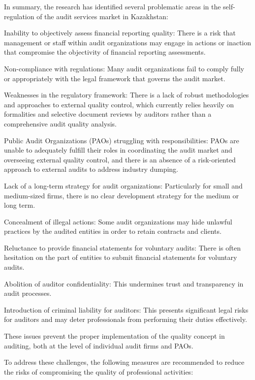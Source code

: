 \begin{multicols}{2}
In summary, the research has identified several problematic areas in the
self-regulation of the audit services market in Kazakhstan:

Inability to objectively assess financial reporting quality: There is a
risk that management or staff within audit organizations may engage in
actions or inaction that compromise the objectivity of financial
reporting assessments.

Non-compliance with regulations: Many audit organizations fail to comply
fully or appropriately with the legal framework that governs the audit
market.

Weaknesses in the regulatory framework: There is a lack of robust
methodologies and approaches to external quality control, which
currently relies heavily on formalities and selective document reviews
by auditors rather than a comprehensive audit quality analysis.

Public Audit Organizations (PAOs) struggling with responsibilities: PAOs
are unable to adequately fulfill their roles in coordinating the audit
market and overseeing external quality control, and there is an absence
of a risk-oriented approach to external audits to address industry
dumping.

Lack of a long-term strategy for audit organizations: Particularly for
small and medium-sized firms, there is no clear development strategy for
the medium or long term.

Concealment of illegal actions: Some audit organizations may hide
unlawful practices by the audited entities in order to retain contracts
and clients.

Reluctance to provide financial statements for voluntary audits: There
is often hesitation on the part of entities to submit financial
statements for voluntary audits.

Abolition of auditor confidentiality: This undermines trust and
transparency in audit processes.

Introduction of criminal liability for auditors: This presents
significant legal risks for auditors and may deter professionals from
performing their duties effectively.

These issues prevent the proper implementation of the quality concept in
auditing, both at the level of individual audit firms and PAOs.

To address these challenges, the following measures are recommended to
reduce the risks of compromising the quality of professional activities:


\end{multicols}
